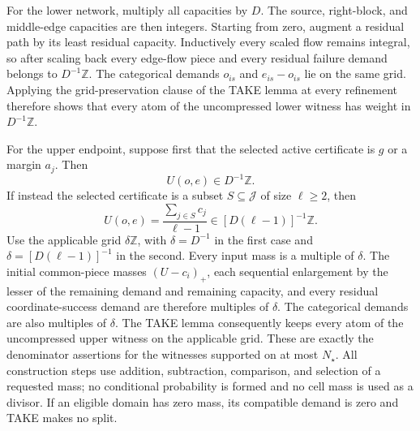 For the lower network, multiply all capacities by \(D\).  The source, right-block, and middle-edge capacities are then integers.  Starting from zero, augment a residual path by its least residual capacity.  Inductively every scaled flow remains integral, so after scaling back every edge-flow piece and every residual failure demand belongs to \(D^{-1}\mathbb Z\).  The categorical demands \(o_{is}\) and \(e_{is}-o_{is}\) lie on the same grid.  Applying the grid-preservation clause of the TAKE lemma at every refinement therefore shows that every atom of the uncompressed lower witness has weight in \(D^{-1}\mathbb Z\).

For the upper endpoint, suppose first that the selected active certificate is \(g\) or a margin \(a_j\).  Then
\[
U(o,e)\in D^{-1}\mathbb Z.
\]
If instead the selected certificate is a subset \(S\subseteq\mathcal J\) of size \(\ell\geq2\), then
\[
U(o,e)=\frac{\sum_{j\in S}c_j}{\ell-1}
\in [D(\ell-1)]^{-1}\mathbb Z.
\]
Use the applicable grid \(\delta\mathbb Z\), with \(\delta=D^{-1}\) in the first case and \(\delta=[D(\ell-1)]^{-1}\) in the second.  Every input mass is a multiple of \(\delta\).  The initial common-piece masses \((U-c_i)_+\), each sequential enlargement by the lesser of the remaining demand and remaining capacity, and every residual coordinate-success demand are therefore multiples of \(\delta\).  The categorical demands are also multiples of \(\delta\).  The TAKE lemma consequently keeps every atom of the uncompressed upper witness on the applicable grid.  These are exactly the denominator assertions for the witnesses supported on at most \(N_\star\).  All construction steps use addition, subtraction, comparison, and selection of a requested mass; no conditional probability is formed and no cell mass is used as a divisor.  If an eligible domain has zero mass, its compatible demand is zero and TAKE makes no split.

